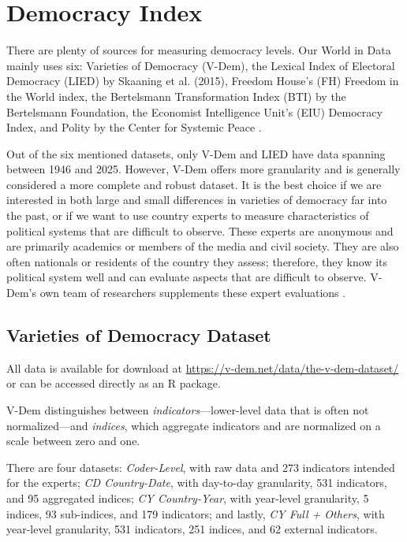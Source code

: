 \section{Democracy Index}

There are plenty of sources for measuring democracy levels. Our World in Data mainly uses six: Varieties of Democracy (V-Dem), the Lexical Index of Electoral Democracy (LIED) by Skaaning et al. (2015), Freedom House's (FH) Freedom in the World index, the Bertelsmann Transformation Index (BTI) by the Bertelsmann Foundation, the Economist Intelligence Unit's (EIU) Democracy Index, and Polity by the Center for Systemic Peace \cite{herre_democracy_2025}. 

Out of the six mentioned datasets, only V-Dem and LIED have data spanning between 1946 and 2025. However, V-Dem offers more granularity and is generally considered a more complete and robust dataset. It is the best choice if we are interested in both large and small differences in varieties of democracy far into the past, or if we want to use country experts to measure characteristics of political systems that are difficult to observe. These experts are anonymous and are primarily academics or members of the media and civil society. They are also often nationals or residents of the country they assess; therefore, they know its political system well and can evaluate aspects that are difficult to observe. V-Dem's own team of researchers supplements these expert evaluations \cite{herre_varieties_2025}.

\subsection{Varieties of Democracy Dataset}

All data is available for download at \url{https://v-dem.net/data/the-v-dem-dataset/} or can be accessed directly as an R package.

V-Dem distinguishes between \textit{indicators}—lower-level data that is often not normalized—and \textit{indices}, which aggregate indicators and are normalized on a scale between zero and one.

There are four datasets: \textit{Coder-Level}, with raw data and 273 indicators intended for the experts; \textit{CD Country-Date}, with day-to-day granularity, 531 indicators, and 95 aggregated indices; \textit{CY Country-Year}, with year-level granularity, 5 indices, 93 sub-indices, and 179 indicators; and lastly, \textit{CY Full + Others}, with year-level granularity, 531 indicators, 251 indices, and 62 external indicators. 

